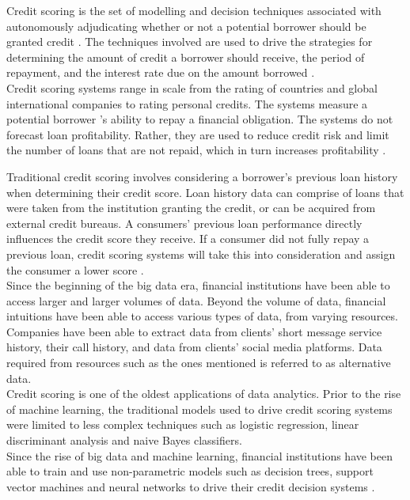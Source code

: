 Credit scoring is the set of modelling and decision techniques associated with autonomously adjudicating whether or not a potential borrower should be granted credit \parencite{PerceptronScoring}. The techniques involved are used to drive the strategies for determining the amount of credit a borrower  should receive, the period of repayment, and the interest rate due on the amount borrowed \parencite{CreditRiskSummary}. \\

Credit scoring systems range in scale from the rating of countries and global international companies to rating personal credits. The systems measure a potential borrower 's ability to repay a financial obligation. The systems do not forecast loan profitability. Rather, they are used to reduce credit risk and limit the number of loans that are not repaid, which in turn increases profitability \parencite{EarlyNNScoring}. \newpage

Traditional credit scoring involves considering a borrower's previous loan history when determining their credit score. Loan history data can comprise of loans that were taken from the institution granting the credit, or can be acquired from external credit bureaus. A consumers' previous loan performance directly influences the credit score they receive. If a consumer did not fully repay a previous loan, credit scoring systems will take this into consideration and assign the consumer a lower score \parencite{DynamicBehaviouralScoring}. \\

Since the beginning of the big data era, financial institutions have been able to access larger and larger volumes of data. Beyond the volume of data, financial intuitions have been able to access various types of data, from varying resources. Companies have been able to extract data from clients' short message service history, their call history, and data from clients' social media platforms. Data required from resources such as the ones mentioned is referred to as alternative data.\\

Credit scoring is one of the oldest applications of data analytics. Prior to the rise of machine learning, the traditional models used to drive credit scoring systems were limited to less complex techniques such as logistic regression, linear discriminant analysis and naive Bayes classifiers.\\

Since the rise of big data and machine learning, financial institutions have been able to train and use non-parametric models such as decision trees, support vector machines and neural networks to drive their credit decision systems \parencite{IntroToCreditModelling}. \\

